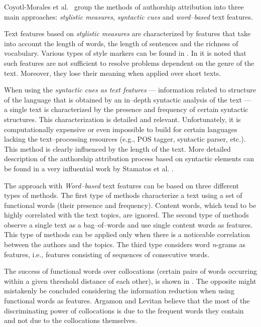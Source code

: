 \documentclass{llncs}
\begin{document}
Coyotl-Morales et al.\ \cite{coyotl2006authorship} group the methods of
authorship attribution into three main approaches: \emph{stylistic measures}, \emph{syntactic cues} and
\emph{word--based} text features.

Text features based on \emph{stylistic measures} are characterized by features that
take into account the length of words, the length of sentences and the richness of vocabulary.
Various types of style markers can be found in
\cite{luyckx2005shallow}. In \cite{coyotl2006authorship} it is noted that such
features are not sufficient to resolve problems dependent on the genre of the
text. Moreover, they lose their meaning when applied over short texts.

When using the \emph{syntactic cues as text features} --- information
related to structure of the language that is obtained by an in--depth syntactic
analysis of the text --- a single text is characterized by the presence and
frequency of certain syntactic structures. This characterization is detailed and relevant.
Unfortunately, it is computationally expensive or even impossible to build for
certain languages lacking the text--processing resources (e.g., POS tagger, syntactic
parser, etc.). This method is clearly influenced by the length of the text. More detailed 
description of the authorship attribution process based on syntactic elements can be found 
in a very influential work by Stamatos et al. \cite{stamatatos2001computer}.

The approach with \emph{Word--based} text features can be based on three
different types of methods. The first type of methods characterize a text
using a set of functional words (their presence and frequency). Content words, which 
tend to be highly correlated with the text topics, are ignored. The second type
of methods observe a single text as a bag--of--words and use single content words as
features. This type of methods can be applied only when there is a noticeable
correlation between the authors and the topics. The third type considers
word \emph{n}-grams as features, i.e., features consisting of sequences of
consecutive words.

The success of functional words over collocations (certain pairs of words
occurring within a given threshold distance of each other), is shown in
\cite{argamon2005measuring}. The opposite might mistakenly be concluded considering
the information reduction when using functional words as features.
Argamon and Levitan \cite{argamon2005measuring} believe that the most of the
discriminating power of collocations is due to the frequent words they contain and not due to the
collocations themselves.
\end{document}

